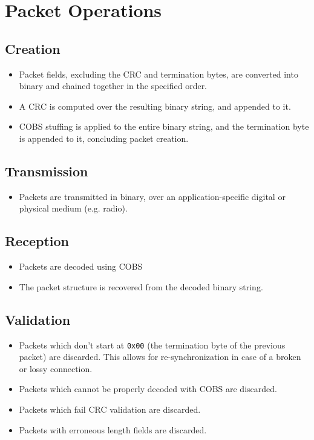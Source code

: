 \documentclass[a4paper,11pt,english]{article}
\begin{document}
\section[ops]{Packet Operations}

\subsection[op:cx]{Creation}
\begin{itemize}
  \item Packet fields, excluding the CRC and termination bytes, are converted into binary and chained together in the specified order.
  \item A CRC is computed over the resulting binary string, and appended to it.
  \item COBS stuffing is applied to the entire binary string, and the termination byte is appended to it, concluding packet creation.
\end{itemize}

\subsection[op:tx]{Transmission}
\begin{itemize}
  \item Packets are transmitted in binary, over an application-specific digital or physical medium (e.g. radio).
\end{itemize}

\subsection[op:rx]{Reception}
\begin{itemize}
  \item Packets are decoded using COBS
  \item The packet structure is recovered from the decoded binary string.
\end{itemize}

\subsection[op:vx]{Validation}
\begin{itemize}
  \item Packets which don't start at \texttt{0x00} (the termination byte of the previous packet) are discarded. This allows for re-synchronization in case of a broken or lossy connection.
  \item Packets which cannot be properly decoded with COBS are discarded.
  \item Packets which fail CRC validation are discarded.
  \item Packets with erroneous length fields are discarded.
\end{itemize}
\end{document}
